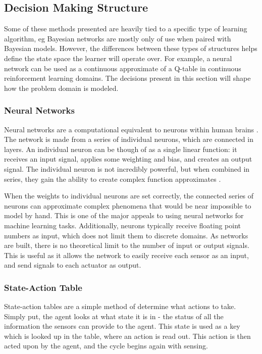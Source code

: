 \subsection{Decision Making Structure}
Some of these methods presented are heavily tied to a specific type of learning algorithm, eg Bayesian networks are mostly only of use when paired with Bayesian models.
However, the differences between these types of structures helps define the state space the learner will operate over.
For example, a neural network can be used as a continuous approximate of a Q-table in continuous reinforcement learning domains.
The decisions present in this section will shape how the problem domain is modeled.

\subsubsection{Neural Networks}
Neural networks are a computational equivalent to neurons within human brains \cite{SuttonBarto}.
The network is made from a series of individual neurons, which are connected in layers.
An individual neuron can be though of as a single linear function: it receives an input signal, applies some weighting and bias, and creates an output signal.
The individual neuron is not incredibly powerful, but when combined in series, they gain the ability to create complex function approximates \cite{SuttonBarto}.

When the weights to individual neurons are set correctly, the connected series of neurons can approximate complex phenomena that would be near impossible to model by hand.
This is one of the major appeals to using neural networks for machine learning tasks.
Additionally, neurons typically receive floating point numbers as input, which does not limit them to discrete domains.
As networks are built, there is no theoretical limit to the number of input or output signals.
This is useful as it allows the network to easily receive each sensor as an input, and send signals to each actuator as output.

\subsubsection{State-Action Table}
State-action tables are a simple method of determine what actions to take.
Simply put, the agent looks at what state it is in - the status of all the information the sensors can provide to the agent.
This state is used as a key which is looked up in the table, where an action is read out.
This action is then acted upon by the agent, and the cycle begins again with sensing.


